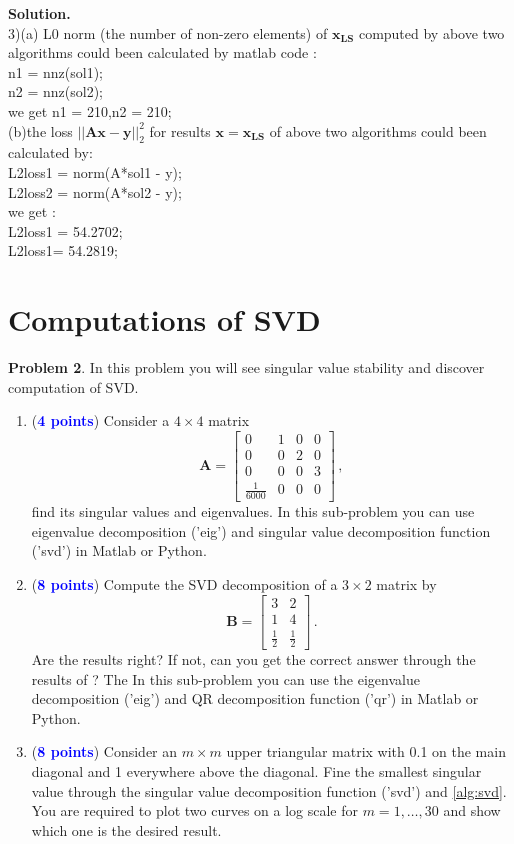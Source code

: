 \documentclass[english,onecolumn]{IEEEtran}
\begin{document}
\noindent
\textbf{Solution.}\\
3)(a) L0 norm (the number of non-zero elements) of $\mathbf{x_{LS}}$ computed by above two algorithms could been calculated by matlab code :\\
n1 = nnz(sol1);\\
n2 = nnz(sol2);\\
we get n1 = 210,n2 = 210; \\
(b)the loss $||\mathbf{Ax-y}||^{2}_{2}$ for results $\mathbf{x}=\mathbf{x_{LS}}$ of above two algorithms
could been calculated by:\\
L2loss1 = norm(A*sol1 - y);\\
L2loss2 = norm(A*sol2 - y);\\
we get :\\
L2loss1 = 54.2702;\\
L2loss1= 54.2819;



\newpage
\section{Computations of SVD}
\noindent\textbf{Problem 2}.
In this problem you will see singular value stability and discover computation of SVD.
\begin{enumerate}
    \item (\textcolor{blue}{\textbf{4 points}}) Consider a $4 \times 4$ matrix
    \[
	\mathbf{A} = \begin{bmatrix}
		0& 1&0&0 \\
		0&0&2&0\\
		0&0&0&3\\
		\frac{1}{6000}&0&0&0
	\end{bmatrix}\,,
	\]
	find its singular values and eigenvalues. In this sub-problem you can use eigenvalue decomposition ('eig') and singular value decomposition function ('svd') in Matlab or Python.
	\item (\textcolor{blue}{\textbf{8 points}}) Compute the SVD decomposition of a $3 \times 2$ matrix by 
	\[
	\mathbf{B} = \begin{bmatrix}
		3& 2 \\
		1&4  \\
		\frac{1}{2}&\frac{1}{2}
	\end{bmatrix}\,.
	\]
Are the results right? If not, can you get the correct answer through the results of ? The In this sub-problem you can use the eigenvalue decomposition ('eig') and QR decomposition function ('qr') in Matlab or Python.
\item (\textcolor{blue}{\textbf{8 points}}) Consider an $m\times m$ upper triangular matrix with 0.1 on the main diagonal and 1 everywhere above the diagonal. Fine the smallest singular value through the singular value decomposition function ('svd') and \cref{alg:svd}. You are required to plot two curves on a log scale for $m=1,\dots,30$ and show which one is the desired result.
\end{enumerate}
\end{document}
